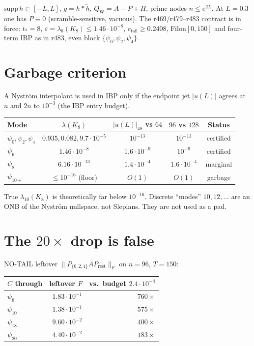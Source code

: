 \documentclass[11pt]{article}
\theoremstyle{remark}
\newcommand{\QW}{Q_{\mathrm W}}
\begin{document}
$\mathrm{supp}\,h\subset[-L,L]$, $g=h*\widetilde h$,
$\QW=A-P+\Pi$, prime nodes $n\le e^{2L}$.
At $L=0.3$ one has $P\equiv0$ (scramble-sensitive,
vacuous).
The r469/r479--r483 contract is in force:
$t_*=8$, $\varepsilon=\lambda_6(K_8)\le1.46\cdot10^{-8}$,
$c_{\mathrm{tail}}\ge0.2408$,
Filon$[0,150]$ and four-term IBP as in r483,
even block $\{\psi_0,\psi_2,\psi_4\}$.

\section{Garbage criterion}

A Nystr\"om interpolant is used in IBP only if the
endpoint jet $|u(L)|$ agrees at $n$ and $2n$ to
$10^{-3}$ (the IBP entry budget).

\begin{center}
\small
\begin{tabular}{@{}lcccc@{}}
\toprule
Mode & $\lambda(K_8)$ & $|u(L)|_{48}$ vs $64$ & $96$ vs $128$ & Status \\
\midrule
$\psi_0,\psi_2,\psi_4$ & $0.935,0.082,9.7\cdot10^{-5}$
  & $10^{-13}$ & $10^{-13}$ & certified \\
$\psi_6$ & $1.46\cdot10^{-8}$ & $1.6\cdot10^{-9}$ & $10^{-9}$ & certified \\
$\psi_8$ & $6.16\cdot10^{-13}$ & $1.4\cdot10^{-4}$ & $1.6\cdot10^{-4}$ & marginal \\
$\psi_{10+}$ & $\le10^{-16}$ (floor) & $O(1)$ & $O(1)$ & garbage \\
\bottomrule
\end{tabular}
\end{center}

True $\lambda_{10}(K_8)$ is theoretically far below
$10^{-16}$.  Discrete ``modes'' $10,12,\dots$ are an
ONB of the Nystr\"om nullspace, not Slepians.
They are not used as a pad.

\section{The $20\times$ drop is false}

NO-TAIL leftover $\|P_{\{0,2,4\}}A P_{\mathrm{rest}}\|_F$
on $n=96$, $T=150$:

\begin{center}
\small
\begin{tabular}{@{}lrr@{}}
\toprule
$C$ through & leftover $F$ & vs.\ budget $2.4\cdot10^{-4}$ \\
\midrule
$\psi_8$ & $1.83\cdot10^{-1}$ & $760\times$ \\
$\psi_{10}$ & $1.38\cdot10^{-1}$ & $575\times$ \\
$\psi_{18}$ & $9.60\cdot10^{-2}$ & $400\times$ \\
$\psi_{20}$ & $4.40\cdot10^{-2}$ & $183\times$ \\
\bottomrule
\end{tabular}
\end{center}
\end{document}
